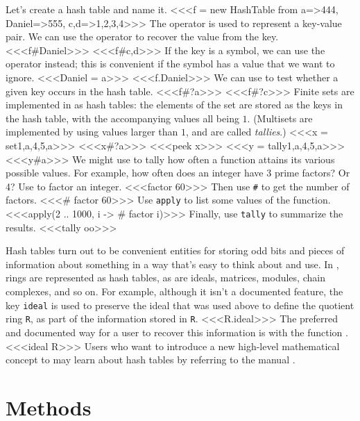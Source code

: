 Let's create a hash table and name it.
<<<f = new HashTable from { a=>444, Daniel=>555, {c,d}=>{1,2,3,4}}>>>
The operator  is used to represent a key-value pair.
We can use the operator \indexcmd{\#}{\tt \#} to recover the value from the key.
<<<f#Daniel>>>
<<<f#{c,d}>>>
If the key is a symbol, we can use the operator  instead; this is
convenient if the symbol has a value that we want to ignore.
<<<Daniel = a>>>
<<<f.Daniel>>>
We can use  to test whether a given key occurs in the hash table.
<<<f#?a>>>
<<<f#?c>>>
Finite sets are implemented in \Mtwo as hash tables: the elements of the set
are stored as the keys in the hash table, with the accompanying values all
being $1$.  (Multisets are implemented by using values larger than $1$, and
are called {\sl tallies}.)
<<<x = set{1,a,{4,5},a}>>>%
<<<x#?a>>>
<<<peek x>>>
<<<y = tally{1,a,{4,5},a}>>>
<<<y#a>>>
We might use  to tally how often a function attains its various
possible values.  For example, how often does an integer have 3 prime
factors?  Or 4?  Use  to factor an integer.
<<<factor 60>>>
Then use {\tt \#} to get the number of factors.
<<<# factor 60>>>
Use {\tt apply} to list some values of the function.
<<<apply(2 .. 1000, i -> # factor i)>>>
Finally, use {\tt tally} to summarize the results.
<<<tally oo>>>

Hash tables turn out to be convenient entities for storing odd bits and
pieces of information about something in a way that's easy to think about and
use.
In \Mtwo, rings are represented as hash tables, as are ideals, matrices,
modules, chain complexes, and so on.  For example, although it isn't a
documented feature, the key {\tt ideal} is used to preserve the ideal that
was used above to define the quotient ring {\tt R}, as part of the
information stored in {\tt R}.  
<<<R.ideal>>>
The preferred and documented way for a user to recover this information is
with the function . 
<<<ideal R>>>
Users who want to introduce a new high-level mathematical
concept to \Mtwo may learn about hash tables by referring to the \Mtwo manual
\cite{M2}.

\section{Methods}

